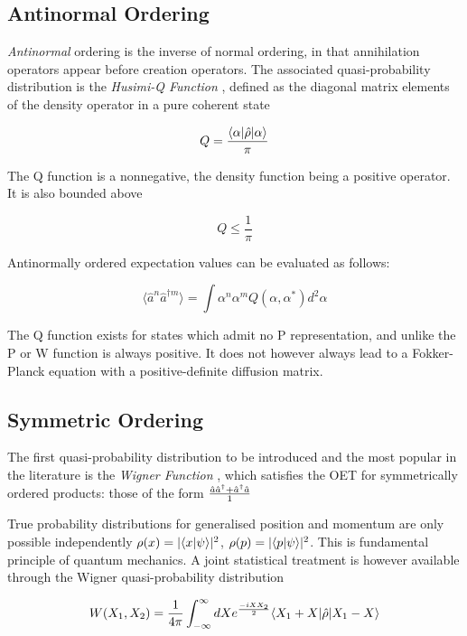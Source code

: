 \subsection{Antinormal Ordering}
\emph{Antinormal} ordering is the inverse of normal ordering, in that annihilation operators appear before creation operators.
The associated quasi-probability distribution is the \emph{Husimi-Q Function} \cite{Husimi1940}, defined as the diagonal matrix elements of the density operator in a pure coherent state

\begin{equation}
	Q = \frac{\langle \alpha | \hat{\rho} | \alpha \rangle}{\pi}
	\label{qdef}
\end{equation}

The Q function is a nonnegative, the density function being a positive operator.
It is also bounded above

\begin{equation}
	Q \leq \frac{1}{\pi}
\end{equation}

Antinormally ordered expectation values can be evaluated as follows:

\begin{equation}
	\langle \hat{a}^n \hat{a}^{\dagger m}  \rangle = \int \alpha^n \alpha^m Q (\alpha, \alpha^*) d^2 \alpha
\end{equation}

The Q function exists for states which admit no P representation, and unlike the P or W function is always positive.
It does not however always lead to a Fokker-Planck equation with a positive-definite diffusion matrix. 

\subsection{Symmetric Ordering}
The first quasi-probability distribution to be introduced and the most popular in the literature is the \emph{Wigner Function} \cite{Wigner1932} , which satisfies the OET for symmetrically ordered products: those of the form $\frac{\hat{a} \hat{a}^\dagger + \hat{a}^\dagger \hat{a}}{1}$

True probability distributions for generalised position and momentum are only possible independently $\rho(x) = |\langle x | \psi \rangle|^2$, $\rho(p) = |\langle p | \psi \rangle|^2$.
This is fundamental principle of quantum mechanics.
A joint statistical treatment is however available through the Wigner quasi-probability distribution

\begin{equation}
	W(X_1, X_2) = \frac{1}{4 \pi} \int_{-\infty}^\infty dX e^{\frac{-iXX_2}{2}} \langle X_1+X | \hat{\rho} | X_1-X \rangle
\end{equation}

